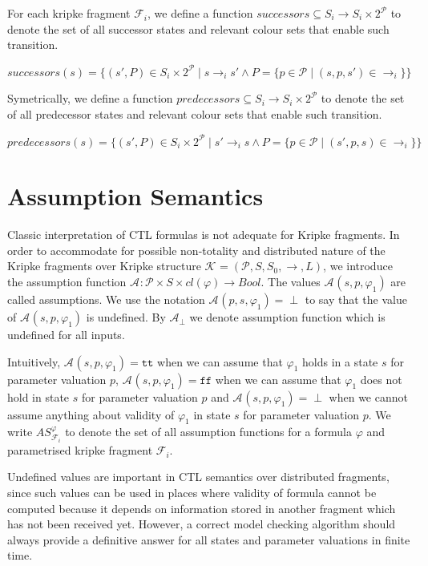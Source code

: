 \documentclass[12pt,oneside, draft]{fithesis2}
\newcommand{\as}[1][]{\ensuremath{\mathcal{A}_{#1}}}
\newcommand{\asemt}{\as[\perp]}
\newcommand{\ASphi}{\ensuremath{AS_{\kf{i}{}}^\varphi}}
\newcommand{\true}{\ensuremath{\texttt{tt}}}
\newcommand{\false}{\ensuremath{\texttt{ff}}}
\newcommand{\ks}[1][]{\ensuremath{\mathcal{K}_{#1}}}
\newcommand{\kf}[2]{\ensuremath{\mathcal{F}^{#2}_{#1}}}
\newcommand{\fullKs}{\ensuremath{ \ks = (\params, S, S_0, \trans{}, L) }}
\newcommand{\trans}[1]{\stackrel{#1}{\rightarrow}}
\newcommand{\params}{\mathcal{P}}
\begin{document}
			For each kripke fragment $\kf{i}{}$, we define a function $successors \subseteq S_{i} \rightarrow S_i \times 2^\params$ to denote the set of all successor states and relevant colour sets that enable such transition.
			
			\begin{center}
				$successors(s) = \{(s', P) \in S_i \times 2^\params \mid s \trans{}_i s' \wedge P = \{p \in \params \mid (s, p, s') \in \trans{}_{i} \}\} $
			\end{center}
			
			Symetrically, we define a function $predecessors \subseteq S_{i} \rightarrow S_i \times 2^\params$ to denote the set of all predecessor states and relevant colour sets that enable such transition.
			
			\begin{center}
				$predecessors(s) = \{(s', P) \in S_i \times 2^\params \mid s' \trans{}_i s \wedge P = \{p \in \params \mid (s', p, s) \in \trans{}_{i} \}\} $
			\end{center}						
			
		\section{Assumption Semantics}
		
			Classic interpretation of CTL formulas is not adequate for Kripke fragments. In order to accommodate for possible non-totality and distributed nature of the Kripke fragments over Kripke structure $\fullKs$, we introduce the assumption function $\as : \params \times S \times cl(\varphi) \rightarrow Bool $. The values $\as(s, p, \varphi_1)$ are called assumptions. We use the notation $\as(p, s, \varphi_1) = \perp $ to say that the value of $\as(s, p, \varphi_1)$ is undefined. By $\asemt$ we denote assumption function which is undefined for all inputs.
			
			Intuitively, $\as(s, p, \varphi_1) = \true$ when we can assume that $\varphi_1$ holds in a state $s$ for parameter valuation $p$, $\as(s, p, \varphi_1) = \false$ when we can assume that $\varphi_1$ does not hold in state $s$ for parameter valuation $p$ and $\as(s, p, \varphi_1) = \perp$ when we cannot assume anything about validity of $\varphi_1$ in state $s$ for parameter valuation $p$. We write $\ASphi$ to denote the set of all assumption functions for a formula $\varphi$ and parametrised kripke fragment $\kf{i}{}$.
			
			Undefined values are important in CTL semantics over distributed fragments, since such values can be used in places where validity of formula cannot be computed because it depends on information stored in another fragment which has not been received yet. However, a correct model checking algorithm should always provide a definitive answer for all states and parameter valuations in finite time.
			
\end{document}
